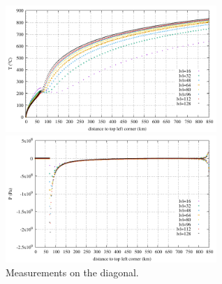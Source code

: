 \begin{center}
\includegraphics[width=8cm]{python_codes/fieldstone_149/results/case1c/diagT.pdf}
\includegraphics[width=8cm]{python_codes/fieldstone_149/results/case1c/diagP.pdf}\\
{\captionfont Measurements on the diagonal.} 
\end{center}

